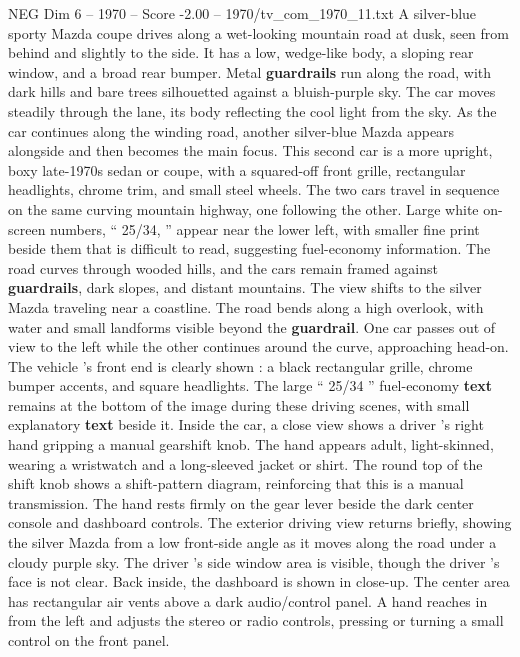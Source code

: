 \begin{textsample}{NEG Dim 6 – 1970 – Score -2.00 – 1970/tv\_com\_1970\_11.txt}  \label{ex:f6_neg_051}
A silver-blue sporty Mazda coupe drives along a wet-looking mountain road at dusk, seen from behind and slightly to the side.
It has a low, wedge-like body, a sloping rear window, and a broad rear bumper.
Metal \textbf{guardrails} run along the road, with dark hills and bare trees silhouetted against a bluish-purple sky.
The car moves steadily through the lane, its body reflecting the cool light from the sky.
As the car continues along the winding road, another silver-blue Mazda appears alongside and then becomes the main focus.
This second car is a more upright, boxy late-1970s sedan or coupe, with a squared-off front grille, rectangular headlights, chrome trim, and small steel wheels.
The two cars travel in sequence on the same curving mountain highway, one following the other.
Large white on-screen numbers, “ 25/34, ” appear near the lower left, with smaller fine print beside them that is difficult to read, suggesting fuel-economy information.
The road curves through wooded hills, and the cars remain framed against \textbf{guardrails}, dark slopes, and distant mountains.
The view shifts to the silver Mazda traveling near a coastline.
The road bends along a high overlook, with water and small landforms visible beyond the \textbf{guardrail}.
One car passes out of view to the left while the other continues around the curve, approaching head-on.
The vehicle ’s front end is clearly shown : a black rectangular grille, chrome bumper accents, and square headlights.
The large “ 25/34 ” fuel-economy \textbf{text} remains at the bottom of the image during these driving scenes, with small explanatory \textbf{text} beside it.
Inside the car, a close view shows a driver ’s right hand gripping a manual gearshift knob.
The hand appears adult, light-skinned, wearing a wristwatch and a long-sleeved jacket or shirt.
The round top of the shift knob shows a shift-pattern diagram, reinforcing that this is a manual transmission.
The hand rests firmly on the gear lever beside the dark center console and dashboard controls.
The exterior driving view returns briefly, showing the silver Mazda from a low front-side angle as it moves along the road under a cloudy purple sky.
The driver ’s side window area is visible, though the driver ’s face is not clear.
Back inside, the dashboard is shown in close-up.
The center area has rectangular air vents above a dark audio/control panel.
A hand reaches in from the left and adjusts the stereo or radio controls, pressing or turning a small control on the front panel.

\end{textsample}
